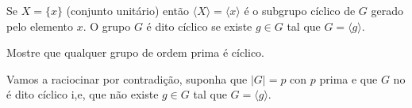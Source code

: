 \begin{homeworkProblem}
  Se $X=\{x\}$ (conjunto unitário) então $\langle X \rangle = \langle x \rangle$ é o subgrupo cíclico de $G$ gerado pelo elemento $x$. O grupo $G$ é dito cíclico se existe $g\in G$ tal que $G=\langle g\rangle$.

  Mostre que qualquer grupo de ordem prima é cíclico.
  \begin{solution}
    Vamos a raciocinar por contradição, suponha que $|G|=p$ con $p$ prima e que $G$ no é dito cíclico i,e, que não existe $g\in G$ tal que $G=\langle g \rangle$. 
  \end{solution}
\end{homeworkProblem}
